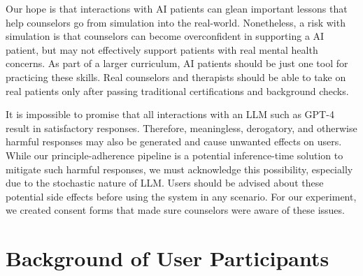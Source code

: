 \documentclass[11pt]{article}
\begin{document}
Our hope is that interactions with AI patients can glean important lessons that help counselors go from simulation into the real-world.  Nonetheless, a risk with simulation is that counselors can become overconfident in supporting a AI patient, but may not effectively support patients with real mental health concerns. As part of a larger curriculum, AI patients should be just one tool for practicing these skills. Real counselors and therapists should be able to take on real patients only after passing traditional certifications and background checks. 


It is impossible to promise that all interactions with an LLM such as GPT-4 result in satisfactory responses. Therefore, meaningless, derogatory, and otherwise harmful responses may also be generated and cause unwanted effects on users. While our principle-adherence pipeline is a potential inference-time solution to mitigate such harmful responses, we must acknowledge this possibility, especially due to the stochastic nature of LLM. Users should be advised about these potential side effects before using the system in any scenario. For our experiment, we created consent forms that made sure counselors were aware of these issues.



% 

\appendix
\newpage




\section{Background of User Participants} \label{sec:participant-background}
\end{document}
